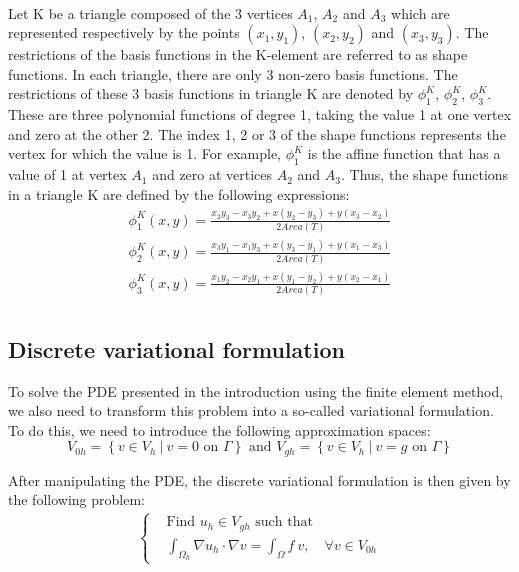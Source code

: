 \documentclass[11pt,a4paper]{article}
\begin{document}
\paragraph{}
Let K be a triangle composed of the 3 vertices $A_1$, $A_2$ and $A_3$ which are represented respectively by the points $(x_1,y_1)$, $(x_2,y_2)$ and $(x_3,y_3)$.
The restrictions of the basis functions in the K-element are referred to as shape functions.
In each triangle, there are only 3 non-zero basis functions. The restrictions of these 3 basis functions in triangle K are denoted by $\phi_1^K$, $\phi_2^K$, $\phi_3^K$. These are
three polynomial functions of degree 1, taking the value 1 at one vertex and zero at the other 2.
The index 1, 2 or 3 of the shape functions represents the vertex for which the value is 1.
For example, $\phi_1^K$ is the affine function that has a value of 1 at vertex $A_1$ and zero at vertices $A_2$ and $A_3$.
Thus, the shape functions in a triangle K are defined by the following expressions:
\begin{eqnarray*}
 \phi_1^K(x,y) = \frac{x_2 y_3 - x_3 y_2 + x (y_2-y_3)+y(x_3-x_2)}{2 Area(T)} \\
 \phi_2^K(x,y) = \frac{x_3 y_1 - x_1 y_3 + x (y_3-y_1)+y(x_1-x_3)}{2 Area(T)} \\
 \phi_3^K(x,y) = \frac{x_1 y_2 - x_2 y_1 + x (y_1-y_2)+y(x_2-x_1)}{2 Area(T)} \\
\end{eqnarray*}



\subsection{Discrete variational formulation}

To solve the PDE presented in the introduction using the finite element method, we also need to transform this problem into a so-called variational formulation.
To do this, we need to introduce the following approximation spaces:
\begin{equation*}
  V_{0h} = \left\{ v \in V_h \ | \ v=0 \text{ on } \Gamma \right\} \text{ and } V_{gh} = \left\{ v \in V_h \ | \ v=g \text{ on } \Gamma \right\}
\end{equation*}

After manipulating the PDE, the discrete variational formulation is then given by the following problem:
\begin{eqnarray}
\left\{
  \begin{aligned}
     &\text{Find $u_h \in V_{gh}$ such that } \\
    &\int_{\Omega_h} \nabla u_h \cdot \nabla v = \int_{\Omega} f \ v, \quad \forall v \in V_{0h}
  \end{aligned}
  \right.
\end{eqnarray}
\end{document}
